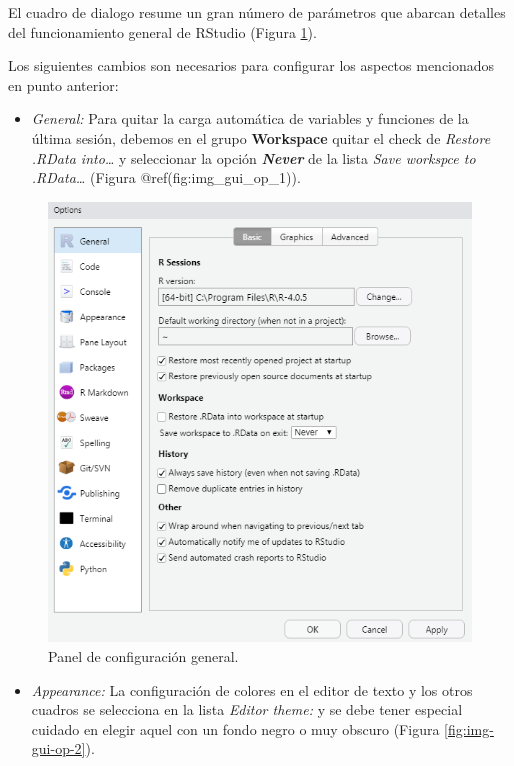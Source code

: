 \documentclass[
]{book}
\providecommand{\tightlist}{%
  \setlength{\itemsep}{0pt}\setlength{\parskip}{0pt}}
\begin{document}
El cuadro de dialogo resume un gran número de parámetros que abarcan detalles del funcionamiento general de RStudio (Figura \ref{fig:img-gui-op-1}).

Los siguientes cambios son necesarios para configurar los aspectos mencionados en punto anterior:

\begin{itemize}
\tightlist
\item
  \emph{General:} Para quitar la carga automática de variables y funciones de la última sesión, debemos en el grupo \textbf{Workspace} quitar el check de \emph{Restore .RData into\ldots{}} y seleccionar la opción \textbf{\emph{Never}} de la lista \emph{Save workspce to .RData\ldots{}} (Figura @ref(fig:img\_gui\_op\_1)).
\end{itemize}

\begin{figure}

{\centering \includegraphics[width=8.17in]{img/ops-general} 

}

\caption{Panel de configuración general.}\label{fig:img-gui-op-1}
\end{figure}

\begin{itemize}
\tightlist
\item
  \emph{Appearance:} La configuración de colores en el editor de texto y los otros cuadros se selecciona en la lista \emph{Editor theme:} y se debe tener especial cuidado en elegir aquel con un fondo negro o muy obscuro (Figura \ref{fig:img-gui-op-2}).
\end{itemize}
\end{document}

